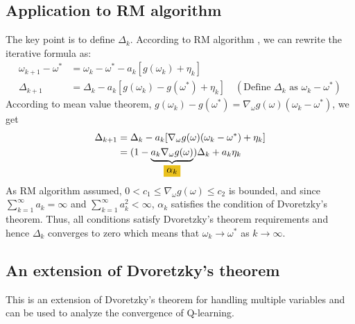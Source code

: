 \subsection{Application to RM algorithm}

  The key point is to define $\Delta_{k}$. According to RM algorithm , we can rewrite the iterative formula as:
  \begin{align*}
    \omega_{k+1} - \omega^{*} & = \omega_{k} - \omega^{*} - a_{k}[g(\omega_{k})+\eta_{k}]                                                                      \\
    \Delta_{k+1}              & = \Delta_{k} - a_{k}[g(\omega_{k})-g(\omega^{*})+\eta_{k}] \quad (\text{Define } \Delta_{k} \text{ as } \omega_{k}-\omega^{*})
  \end{align*}
  According to mean value theorem, $g(\omega_{k})-g(\omega^{*})=\nabla_{\omega} g(\omega)(\omega_{k}-\omega^{*})$, we get
  \begin{align*}
    \Delta_{k+1} & = \Delta_{k} - a_{k}[\nabla_{\omega} g(\omega)(\omega_{k}-\omega^{*})+\eta_{k}]                                           \\
                 & = (1-\underbrace{a_{k}\nabla_{\omega} g(\omega)}_{\colorbox{myyellow!80!myred}{$\alpha_{k}$}}) \Delta_{k} + a_{k}\eta_{k}
  \end{align*}
  As RM algorithm assumed, $0<c_{1}\le \nabla_{\omega} g(\omega) \le c_{2}$ is bounded, and since
  $\sum_{k=1}^{\infty}a_{k}=\infty$ and $\sum_{k=1}^{\infty}a_{k}^{2}<\infty$, $\alpha_{k}$ satisfies the condition of
  Dvoretzky's theorem. Thus, all conditions satisfy Dvoretzky's theorem requirements  and hence $\Delta_{k}$ converges to zero which means that $\omega_{k}
    \to \omega^{*}$ as $k\to \infty$.

\subsection{An extension of Dvoretzky's theorem}

  This is an extension of Dvoretzky's theorem for handling multiple variables and can be used to analyze the convergence
  of Q-learning.
